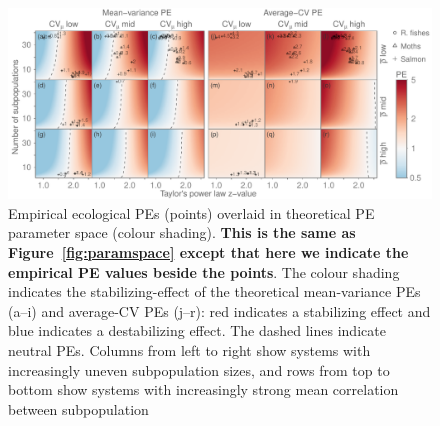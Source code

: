\begin{figure}[htbp]
  \centering
  \includegraphics[width=\textwidth]{prophets/PE-parameter-space-labels-20120614.pdf}
  \caption{Empirical ecological PEs (points) overlaid in theoretical PE
    parameter space (colour shading). \textbf{This is the same as
    Figure~\ref{fig:paramspace} except that here we indicate the empirical PE values
      beside the points}. The colour shading indicates the
    stabilizing-effect of the theoretical mean-variance PEs (a--i) and
    average-CV PEs (j--r): red indicates a stabilizing effect and blue indicates
    a destabilizing effect.
    The dashed lines indicate neutral PEs. Columns from left to right
    show systems with increasingly uneven subpopulation sizes,
    and rows from top to bottom show systems with increasingly strong mean
    correlation between subpopulation
}
\label{fig:paramspace-labels}
\end{figure}
\clearpage

